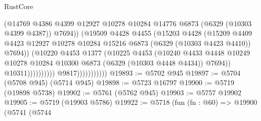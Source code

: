 \begin{lexlean}{RustCore}
\begin{coremodule}
                                            (@14769
                                              @4386
                                              @4399
                                              @12927
                                              @10278
                                              @10284
                                              @14776
                                              @6873
                                              (@6329 (@10303 @4399 @4387))
                                              @7694))
                                          (@19509
                                            @4428
                                            @4455
                                            (@15203
                                              @4428
                                              (@15209
                                                @4409
                                                @4423
                                                @12927
                                                @10278
                                                @10284
                                                @15216
                                                @6873
                                                (@6329 (@10303 @4423 @4410))
                                                @7694))
                                            (@10220
                                              @4453
                                              @1377
                                              (@10225
                                                @4453
                                                (@10240
                                                  @4433
                                                  @4448
                                                  @10249
                                                  @10278
                                                  @10284
                                                  @10300
                                                  @6873
                                                  (@6329 (@10303 @4448 @4434))
                                                  @7694))
                                              @10311))))))))))
                          @9817)))))))))))
@19893 := @5702 @945
@19897 := @5704 (@5708 @945) (@5714 @945)
@19898 := @5723 @16797
@19900 := @5719 (@19898 @5738)
@19902 := @5761 (@5762 @945)
@19903 := @5757 @19902
@19905 := @5719 (@19903 @5786)
@19922 := @5718
    (fun (fn : @60) =>
    @19900
      (@5741
        (@5744

\end{coremodule}
\end{lexlean}
